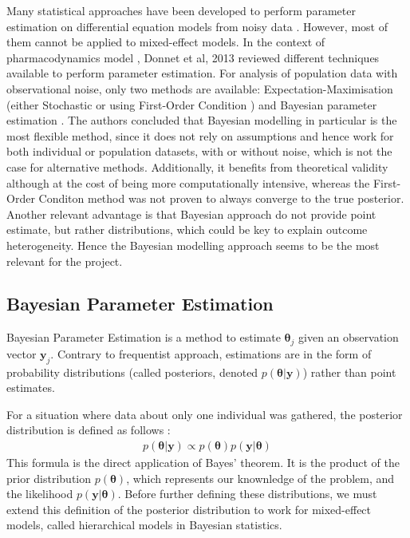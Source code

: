 \documentclass[11pt]{article}
\begin{document}
Many statistical approaches have been developed to perform parameter estimation on differential equation models from noisy data \cite{liu_wang}. However, most of them cannot be applied to mixed-effect models. In the context of pharmacodynamics model , Donnet et al, 2013 \cite{revParamEst} reviewed different techniques available to perform parameter estimation. For analysis of population data with observational noise, only two methods are available: Expectation-Maximisation (either Stochastic \cite{SAEM} or using First-Order Condition \cite{foce}) and Bayesian parameter estimation \cite{rosenbaum}. The authors concluded that Bayesian modelling in particular is the most flexible method, since it does not rely on assumptions and hence work for both individual or population datasets, with or without noise, which is not the case for alternative methods. Additionally, it benefits from theoretical validity although at the cost of being more computationally intensive, whereas the First-Order Conditon method was not proven to always converge to the true posterior. Another relevant advantage is that Bayesian approach do not provide point estimate, but rather distributions, which could be key to explain outcome heterogeneity. Hence the Bayesian modelling approach seems to be the most relevant for the project. 

\subsection{Bayesian Parameter Estimation}

Bayesian Parameter Estimation is a method to estimate $\boldsymbol{\theta}_j$ given an observation vector $\boldsymbol{y}_j$. Contrary to frequentist approach, estimations are in the form of probability distributions (called posteriors, denoted $p(\boldsymbol{\theta}|\boldsymbol{y})$) rather than point estimates. 

For a situation where data about only one individual was gathered, the posterior distribution is defined as follows \cite{tbk_gelman}:
\begin{align*}
    p(\boldsymbol{\theta} | \boldsymbol{y}) \propto p(\boldsymbol{\theta})p(\boldsymbol{y}|\boldsymbol{\theta})
\end{align*} 
This formula is the direct application of Bayes' theorem. It is the product of the prior distribution $p(\boldsymbol{\theta})$, which represents our knownledge of the problem, and the likelihood $p(\boldsymbol{y} | \boldsymbol{\theta})$. Before further defining these distributions, we must extend this definition of the posterior distribution to work for mixed-effect models, called hierarchical models in Bayesian statistics. 
\end{document}
